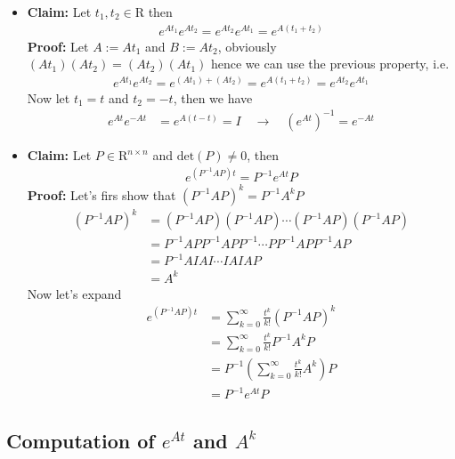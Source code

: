 \documentclass[twoside]{article}
\begin{document}
\begin{itemize}
\item \textbf{Claim:} Let $t_1 , t_2 \in \mathrm{R}$ then
%
\begin{align*}
  e^{A t_1} e^{A t_2} = e^{A t_2} e^{A t_1} = e^{A \left( t_1 + t_2 \right)}
\end{align*}
%
\textbf{Proof:} Let $A := A t_1$ and $B := A t_2$, obviously $(A t_1) (A t_2) = (A t_2) (A t_1)$ hence we can use the 
previous property, i.e. 
%
\begin{align*}
e^{A t_1} e^{A t_2} = e^{ \left( A t_1 \right) +  \left( A  t_2 \right)}
= e^{A \left( t_1 + t_2 \right)} = e^{A t_2} e^{A t_1} 
%
\end{align*}
%
Now let $t_1 = t$ and $t_2 = -t$, then we have
%
\begin{align*}
	e^{A t} e^{-A t} &= e^{A (t - t)} = I \quad \rightarrow \quad
                           \left( e^{A t} \right)^{-1} = e^{-A t}
\end{align*}

\item \textbf{Claim:} Let $P \in \mathrm{R}^{n \times n}$ and
 $\mathrm{det}(P) \neq 0$, then
%
\begin{align*}
	e^{\left(P^{-1} A P \right) t} = P^{-1} e^{A t} P
\end{align*}
%
\textbf{Proof:} Let's firs show that $ \left(P^{-1} A P \right)^k  = P^{-1} A^k P $
%
\begin{align*}
	\left(P^{-1} A P \right)^k &= \left(P^{-1} A P \right) \left(P^{-1} A P \right) \cdots \left(P^{-1} A P \right) \left(P^{-1} A P \right)
	\\
	&= P^{-1} A P P^{-1} A P P^{-1} \cdots P P^{-1} A P P^{-1} A P 
	\\
	&= P^{-1} A I A I \cdots I A I A P 
	\\
	&= A^k
\end{align*}
%
Now let's expand
%
\begin{align*}
	e^{\left(P^{-1} A P \right) t} &= \sum\limits_{k=0}^{\infty} \frac{t^k}{k!} \left(P^{-1} A P \right)^k
	\\
	&= \sum\limits_{k=0}^{\infty} \frac{t^k}{k!} P^{-1} A^k P 
	\\
	&= P^{-1} \left(  \sum\limits_{k=0}^{\infty} \frac{t^k}{k!}  A^k \right) P 
	\\
	&= P^{-1} e^{A t} P
\end{align*}

\end{itemize}

\subsection{Computation of $e^{At}$ and $A^k$}
\end{document}
